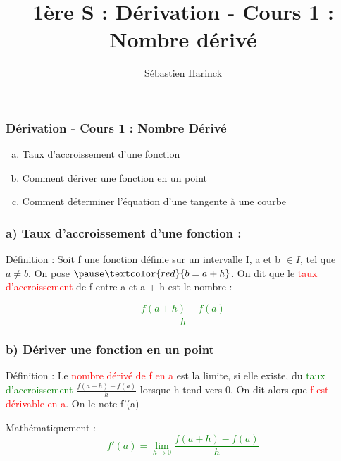 \documentclass[t]{beamer}
\title{1ère S : Dérivation - Cours 1 : Nombre dérivé}
\author{Sébastien Harinck}
\institute{www.cours-futes.com}
\date{}
\begin{document}
\begin{frame}
\frametitle{Dérivation - Cours 1 : Nombre Dérivé}
\begin{enumerate}[a)]
\item Taux d'accroissement d'une fonction
\item Comment dériver une fonction en un point
\item Comment déterminer l'équation d'une tangente à une courbe
\end{enumerate}
\end{frame}

\begin{frame}[label=pagebanale]
\frametitle{a)  Taux d'accroissement d'une fonction : }
\pause
\begin{block}{Définition :}
\pause
Soit f une fonction définie sur un intervalle I, \pause a et b $ \in I$, \pause tel que $a \ne b$. \pause On pose $\pause \textcolor{red}{ b = a + h}$. \pause
On dit que le \textcolor{red}{taux d'accroissement} de f \pause entre a et a + h \pause est le nombre : 
\pause
\end{block}
\begin{block}
{\Huge \textcolor{green}{\[\frac{f(a+h) - f(a)}{h}\]}}
\end{block}
\end{frame}

\begin{frame}[label=pagebanale]
\frametitle{b) Dériver une fonction en un point}
\pause
\begin{block}{Définition :}
\pause
Le \textcolor{red}{nombre dérivé de f en a} est la limite, \pause si elle existe, \pause du \textcolor{green}{taux d'accroissement} \pause
\(\frac{f(a+h) - f(a)}{h}\)
\pause
lorsque h tend vers 0. \pause 
On dit alors que \textcolor{red}{f est dérivable en a}. \pause On le note f'(a)
\pause
\end{block}
\begin{block}{Mathématiquement :}
\pause
{\Huge \textcolor{green}{\[ f'(a) = \lim\limits_{h \rightarrow 0}\frac{f(a+h) - f(a)}{h}\]}}
\end{block}
\end{frame}
\end{document}
